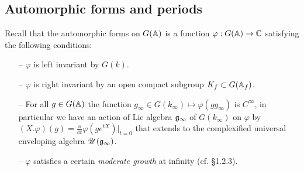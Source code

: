 \subsection{Automorphic forms and periods}

Recall that the automorphic forms on $G(\mathbb{A})$ is a function $\varphi: G(\mathbb{A})\to \mathbb{C}$ satisfying the following conditions:
\begin{itemize}
    \item[--] $\varphi$ is left invariant by $G(k)$.
    \item[--] $\varphi$ is right invariant by an open compact subgroup $K_f \subset G(\mathbb{A}_f)$.
    \item[--] For all $g \in G(\mathbb{A})$ the function $g_\infty \in G(k_\infty) \mapsto \varphi(gg_\infty)$ is $C^\infty$, in particular we have an action of Lie algebra $\mathfrak{g}_\infty$ of $G(k_\infty)$ on $\varphi$ by $(X.\varphi)(g) = \frac{\dd}{\dd t}\varphi(g e^{tX})|_{t=0}$ that extends to the complexified universal enveloping algebra $\mathscr{U}(\mathfrak{g}_\infty)$.
    \item[--] $\varphi$ satisfies a certain \emph{moderate growth} at infinity (cf. \cite{moeglin1994decomposition} \S 1.2.3).
\end{itemize}

